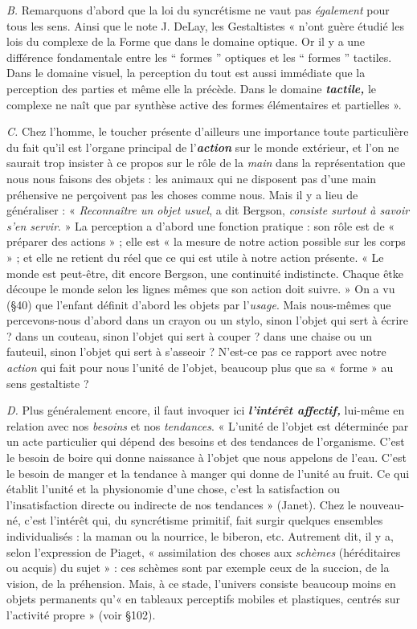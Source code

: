 {\it B.} Remarquons d'abord que la loi du syncrétisme ne vaut pas
{\it également} pour tous les sens. Ainsi que le note J. DeLay, les Gestaltistes
« n'ont guère étudié les lois du complexe de la Forme que dans
le domaine optique. Or il y a une différence fondamentale entre les
“ formes ” optiques et les “ formes ” tactiles. Dans le domaine visuel,
la perception du tout est aussi immédiate que la perception des
parties et même elle la précède. Dans le domaine \textbf{\textit {tactile,}} le complexe
ne naît que par synthèse active des formes élémentaires et partielles ».

{\it C.} Chez l’homme, le toucher présente d’ailleurs une importance
toute particulière du fait qu’il est l’organe principal de l’\textbf{\textit {action}} sur
le monde extérieur, et l’on ne saurait trop insister à ce propos sur le rôle
de la {\it main} dans la représentation que nous nous faisons des objets :
les animaux qui ne disposent pas d’une main préhensive ne perçoivent
pas les choses comme nous. Mais il y a lieu de généraliser :
« {\it Reconnaître un objet usuel}, a dit Bergson, {\it consiste surtout à savoir
s’en servir}. » La perception a d’abord une fonction pratique : son
rôle est de « préparer des actions » ; elle est « la mesure de notre
action possible sur les corps » ; et elle ne retient du réel que ce qui est
utile à notre action présente. « Le monde est peut-être, dit encore
Bergson, une continuité indistincte. Chaque êtke découpe le monde
selon les lignes mêmes que son action doit suivre. » On a vu (\S 40)
que l’enfant définit d’abord les objets par l’{\it usage}. Mais nous-mêmes
que percevons-nous d’abord dans un crayon ou un stylo, sinon l’objet
qui sert à écrire ? dans un couteau, sinon l’objet qui sert à couper ?
dans une chaise ou un fauteuil, sinon l’objet qui sert à s’asseoir ?
N'est-ce pas ce rapport avec notre {\it action} qui fait pour nous l’unité de
l’objet, beaucoup plus que sa « forme » au sens gestaltiste ?

{\it D.} Plus généralement encore, il faut invoquer ici \textbf{\textit {l’intérêt affectif,}}
lui-même en relation avec nos {\it besoins} et nos {\it tendances}. « L'unité de
l’objet est déterminée par un acte particulier qui dépend des besoins
et des tendances de l’organisme. C’est le besoin de boire qui donne
naissance à l’objet que nous appelons de l’eau. C’est le besoin de
manger et la tendance à manger qui donne de l’unité au fruit. Ce qui
établit l’unité et la physionomie d’une chose, c’est la satisfaction ou
l’insatisfaction directe ou indirecte de nos tendances » (Janet). Chez
le nouveau-né, c’est l'intérêt qui, du syncrétisme primitif, fait surgir
quelques ensembles individualisés : la maman ou la nourrice, le
biberon, etc. Autrement dit, il y a, selon l’expression de Piaget,
« assimilation des choses aux {\it schèmes} (héréditaires ou acquis) du sujet » :
ces schèmes sont par exemple ceux de la succion, de la vision, de la
préhension. Mais, à ce stade, l’univers consiste beaucoup moins en
objets permanents qu’« en tableaux perceptifs mobiles et plastiques,
centrés sur l’activité propre » (voir \S 102).

